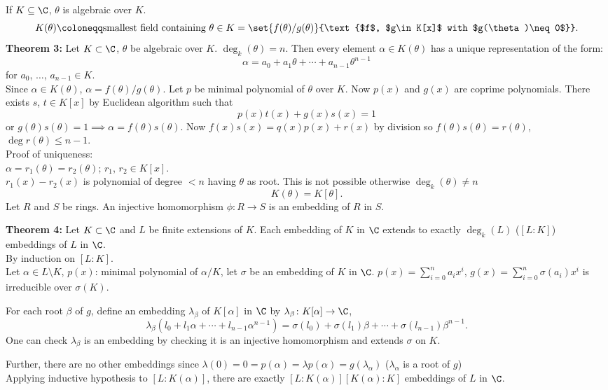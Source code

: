 If $K\subseteq\C$, $\theta$ is algebraic over $K$.
\[ K(\theta) \coloneqq \text{smallest field containing $\theta\in K$} = \set{f(\theta)/g(\theta)}{\text{$f$, $g\in K[x]$ with $g(\theta)\neq0$}} . \]
\textbf{Theorem 3:} Let $K\subset\C$, $\theta$ be algebraic over $K$. $\deg_k(\theta)=n$. Then every element $\alpha\in K(\theta)$ has a unique representation of the form:
\[ \alpha = a_0 + a_1 \theta + \dotsb + a_{n-1}\theta^{n-1} \]
for $a_0$, $\dotsc$, $a_{n-1}\in K$. \\
\pf Since $\alpha\in K(\theta)$, $\alpha=f(\theta)/g(\theta)$.  Let $p$ be minimal polynomial of $\theta$ over $K$.  Now $p(x)$ and $g(x)$ are coprime polynomials.  There exists $s$, $t\in K[x]$ by Euclidean algorithm such that
\[ p(x)t(x) + g(x)s(x) = 1 \]
or $g(\theta)s(\theta)=1\implies\alpha=f(\theta)s(\theta)$.  Now $f(x)s(x)=q(x)p(x)+r(x)$ by division so $f(\theta)s(\theta)=r(\theta)$, $\deg r(\theta)\leq n-1$. \\
Proof of uniqueness: \\
$\alpha=r_1(\theta)=r_2(\theta)$; $r_1$, $r_2\in K[x]$. \\
$r_1(x)-r_2(x)$ is polynomial of degree $<n$ having $\theta$ as root.  This is not possible otherwise $\deg_k(\theta)\neq n$
\[ K(\theta) = K[\theta] . \]
 Let $R$ and $S$ be rings.  An injective homomorphism $\phi\colon R\to S$ is an embedding of $R$ in $S$.

\textbf{Theorem 4:} Let $K\subset\C$ and $L$ be finite extensions of $K$.  Each embedding of $K$ in $\C$ extends to exactly $\deg_k(L)$ ($[L:K]$) embeddings of $L$ in $\C$. \\
\pf By induction on $[L:K]$. \\
Let $\alpha\in L\setminus K$, $p(x)$: minimal polynomial of $\alpha/K$, let $\sigma$ be an embedding of $K$ in $\C$. $p(x)=\sum_{i=0}^n a_i x^i$, $g(x)=\sum_{i=0}^n\sigma(a_i)x^i$ is irreducible over $\sigma(K)$.

For each root $\beta$ of $g$, define an embedding $\lambda_\beta$ of $K[\alpha]$ in $\C$ by $\lambda_\beta\colon K[\alpha]\to\C$,
\[ \lambda_\beta(l_0+l_1\alpha+\dotsb+l_{n-1}\alpha^{n-1}) = \sigma(l_0) + \sigma(l_1)\beta + \dotsb + \sigma(l_{n-1})\beta^{n-1} . \]
One can check $\lambda_\beta$ is an embedding by checking it is an injective homomorphism and extends $\sigma$ on $K$.

Further, there are no other embeddings since $\lambda(0)=0=p(\alpha)=\lambda p(\alpha)=g(\lambda_\alpha)$ ($\lambda_\alpha$ is a root of $g$) \\
Applying inductive hypothesis to $[L:K(\alpha)]$, there are exactly $[L:K(\alpha)][K(\alpha):K]$ embeddings of $L$ in $\C$.

